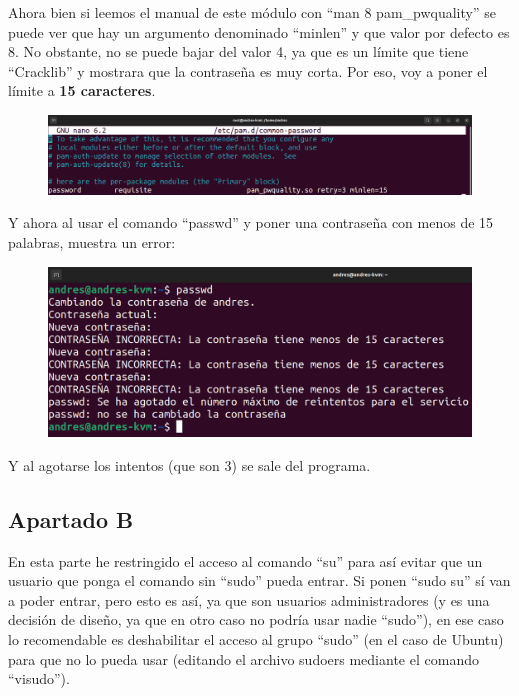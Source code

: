 \documentclass{article}
\begin{document}
Ahora bien si leemos el manual de este módulo con ``man 8 pam\_pwquality'' se puede ver que hay un argumento denominado ``minlen'' y que valor por defecto es 8. No obstante, no se puede bajar del valor 4, ya que es un límite que tiene ``Cracklib'' y mostrara que la contraseña es muy corta. Por eso, voy a poner el límite a \textbf{15 caracteres}.

\begin{figure}[H]
    \includegraphics[width=\textwidth]{imagenes/passwordminlen15.png}
\end{figure}

Y ahora al usar el comando ``passwd'' y poner una contraseña con menos de 15 palabras, muestra un error:

\begin{figure}[H]
    \includegraphics[width=\textwidth]{imagenes/passwordminlen15passwd.png}
\end{figure}

Y al agotarse los intentos (que son 3) se sale del programa.
\subsection*{Apartado B}
En esta parte he restringido el acceso al comando ``su'' para así evitar que un usuario que ponga el comando sin ``sudo'' pueda entrar. Si ponen ``sudo su'' sí van a poder entrar, pero esto es así, ya que son usuarios administradores (y es una decisión de diseño, ya que en otro caso no podría usar nadie ``sudo''), en ese caso lo recomendable es deshabilitar el acceso al grupo ``sudo'' (en el caso de Ubuntu) para que no lo pueda usar (editando el archivo sudoers mediante el comando ``visudo'').
\end{document}
